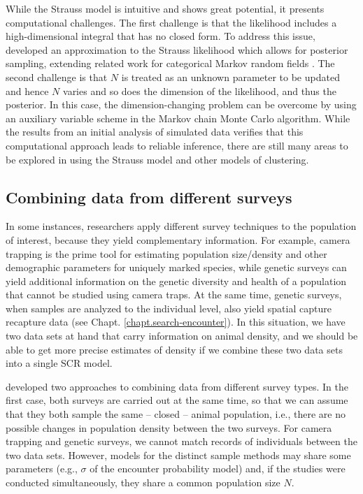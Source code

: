 While the Strauss model is intuitive and shows great potential, it
presents computational challenges. The first challenge is that the
likelihood includes a high-dimensional integral that has no closed
form. To address this issue, \citet{reich_etal:2012} developed an
approximation to the Strauss likelihood which allows for posterior
sampling, extending related work for categorical Markov random fields
\citep{green_richardson:2002,smith_smith:2006}. The second challenge
is that $N$ is treated as an unknown parameter to be updated and hence
$N$ varies and so does the dimension of the likelihood, and thus the
posterior.
In this case, the dimension-changing problem can be
overcome by using an auxiliary variable scheme in the Markov chain
Monte Carlo algorithm.
While the results from an initial analysis of simulated data verifies
that this computational approach leads to reliable inference, there
are still many areas to be explored in using the Strauss model and
other models of clustering.


\subsection{Combining data from different surveys}

In some instances, researchers apply different survey techniques to
the population of interest, because they yield complementary
information. For example, camera trapping is the prime tool for
estimating population size/density and other demographic parameters
for uniquely marked species, while genetic surveys can yield additional
information on the genetic diversity and health of a population that
cannot be studied using camera traps. At the same time, genetic surveys,
when samples are analyzed to the individual level, also yield spatial
capture recapture data (see Chapt. \ref{chapt.search-encounter}). In
this situation, we have two data sets at hand that carry information
on animal density, and we should be able to get more precise estimates
of density if we combine these two data sets into a single SCR model.

\citet{gopalaswamy_etal:2012mee} developed two approaches to combining
data from different survey types. In the first case, both surveys are
carried out at the same time, so that we can assume that they both
sample the same -- closed -- animal population, i.e., there are no
possible changes in population density between the two surveys. For
camera trapping and genetic surveys, we cannot match records of
individuals between the two data sets. However, models for the
distinct sample methods may share some parameters (e.g., $\sigma$ of
the encounter probability model) and, if the studies were conducted
simultaneously, they share a common population size $N$.

